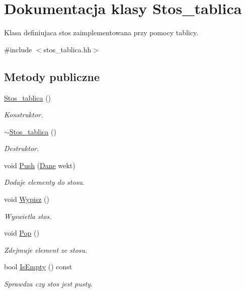 \hypertarget{class_stos__tablica}{\section{\-Dokumentacja klasy \-Stos\-\_\-tablica}
\label{class_stos__tablica}
}


\-Klasa definiujaca stos zaimplementowana przy pomocy tablicy.  




{\ttfamily \#include $<$stos\-\_\-tablica.\-hh$>$}

\subsection*{\-Metody publiczne}
\begin{DoxyCompactItemize}
\item 
\hyperlink{class_stos__tablica_a09994f8361fb437e3f733d562e421d80}{\-Stos\-\_\-tablica} ()
\begin{DoxyCompactList}\small\item\em \-Konstruktor. \end{DoxyCompactList}\item 
\hyperlink{class_stos__tablica_acbdc34c47a2018bea8159bd0d8fbaff6}{$\sim$\-Stos\-\_\-tablica} ()
\begin{DoxyCompactList}\small\item\em \-Destruktor. \end{DoxyCompactList}\item 
void \hyperlink{class_stos__tablica_a85be440694b870657ea478d523dfa549}{\-Push} (\hyperlink{class_dane}{\-Dane} wekt)
\begin{DoxyCompactList}\small\item\em \-Dodaje elementy do stosu. \end{DoxyCompactList}\item 
void \hyperlink{class_stos__tablica_a46b67fa79b06ebdf263d58c5dea10a77}{\-Wypisz} ()
\begin{DoxyCompactList}\small\item\em \-Wyswietla stos. \end{DoxyCompactList}\item 
void \hyperlink{class_stos__tablica_a2ccb3734d9c77e29f336fb141a9f559a}{\-Pop} ()
\begin{DoxyCompactList}\small\item\em \-Zdejmuje element ze stosu. \end{DoxyCompactList}\item 
bool \hyperlink{class_stos__tablica_a4457f168285c5fdee3d12939cd1e5f08}{\-Is\-Empty} () const 
\begin{DoxyCompactList}\small\item\em \-Sprawdza czy stos jest pusty. \end{DoxyCompactList}\end{DoxyCompactItemize}


